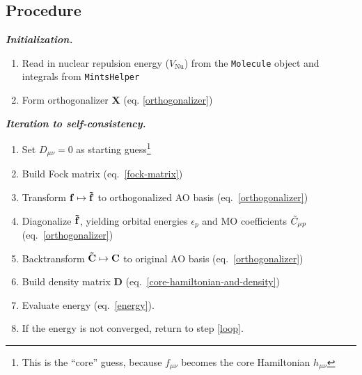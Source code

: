 \documentclass[11pt]{article}
\newcommand{\linl}[1]{\lstinline{#1}{}}
\newcommand{\ev}{\epsilon}   %
\newcommand{\tl}{\ensuremath{\tilde}}
\newcommand{\bmit}[1]{{\bfseries\itshape\mathversion{bold}#1}}
\newcommand{\bo}[1]{\ensuremath{\mathbf{#1}}}
\begin{document}
\subsection*{Procedure}

\bmit{Initialization.}
\begin{enumerate}
  \item Read in nuclear repulsion energy ($V_\mathrm{Nu}$) from the \linl{Molecule} object and integrals from \linl{MintsHelper}
  \item Form orthogonalizer $\bo{X}$ (eq. \ref{orthogonalizer})
\end{enumerate}

\noindent
\bmit{Iteration to self-consistency.}
\begin{enumerate}
  \item Set $D_{\mu\nu}=0$ as starting guess\footnote{This is the ``core'' guess, because $f_{\mu\nu}$ becomes the core Hamiltonian $h_{\mu\nu}$}
  \item\label{loop} Build Fock matrix (eq.~\ref{fock-matrix})
  \item Transform $\bo{f}\mapsto\bo{\tl{f}}$ to orthogonalized AO basis (eq.~\ref{orthogonalizer})
  \item Diagonalize $\bo{\tl{f}}$, yielding orbital energies $\ev_p$ and MO coefficients $\tl{C}_{\mu p}$ (eq.~\ref{orthogonalizer})
  \item Backtransform $\bo{\tl{C}}\mapsto\bo{C}$ to original AO basis (eq.~\ref{orthogonalizer})
  \item Build density matrix $\bo{D}$ (eq.~\ref{core-hamiltonian-and-density})
  \item Evaluate energy (eq.~\ref{energy}).
  \item If the energy is not converged, return to step \ref{loop}.
\end{enumerate}
\end{document}
